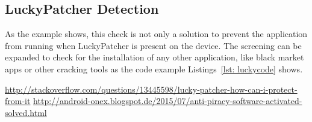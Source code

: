 \subsection{LuckyPatcher Detection}\label{subsection:tampering-luckypatcher}

As the example shows, this check is not only a solution to prevent the application from running when LuckyPatcher is present on the device. The screening can be expanded to check for the installation of any other application, like black market apps or other cracking tools as the code example Listings~\ref{lst: luckycode} shows.

\url{http://stackoverflow.com/questions/13445598/lucky-patcher-how-can-i-protect-from-it}\newline
\url{http://android-onex.blogspot.de/2015/07/anti-piracy-software-activated-solved.html}\newline


